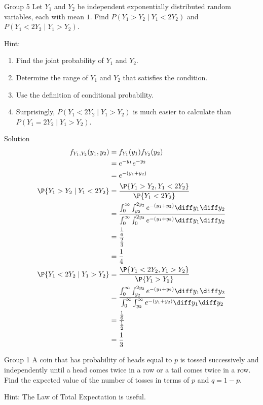 \documentclass{article}
\theoremstyle{plain}
\theoremstyle{definition}
\theoremstyle{remark}
\begin{document}
\begin{problem}
    {Group 5}
    Let $Y_1$ and $Y_2$ be independent exponentially distributed random variables, each with mean $1$. Find $P( Y_1 > Y_2 \mid Y_1 < 2Y_2)$ and $P( Y_1 < 2Y_2 \mid Y_1 > Y_2)$.
    \begin{solution}
        {Hint:}
        \begin{enumerate}
            \item Find the joint probability of $Y_1$ and $Y_2$.
            \item Determine the range of $Y_1$ and $Y_2$ that satisfies the condition.
            \item Use the definition of conditional probability.
            \item Surprisingly, $P( Y_1 < 2Y_2 \mid Y_1 > Y_2)$ is much easier to calculate than $P( Y_1 = 2Y_2 \mid Y_1 > Y_2)$.
        \end{enumerate}
    \end{solution}
\end{problem}

\begin{solution}
    {Solution}
    \begin{align*}
        f_{Y_1,Y_2}(y_1,y_2)
        &= f_{Y_1}(y_1)f_{Y_2}(y_2) \\
        &= e^{-y_1}e^{-y_2} \\
        &= e^{-(y_1+y_2)} \\
        \P{Y_1>Y_2\mid Y_1<2Y_2}
        &= \frac{\P{Y_1>Y_2,Y_1<2Y_2}}{\P{Y_1<2Y_2}} \\
        &= \frac{\int_{0}^{\infty}\int_{y_2}^{2y_2}e^{-(y_1+y_2)}\diff y_1\diff y_2}{\int_{0}^{\infty}\int_{0}^{2y_2}e^{-(y_1+y_2)}\diff y_1\diff y_2} \\
        &= \frac{\frac{1}{6}}{\frac{2}{3}} \\
        &= \frac{1}{4} \\
        \P{Y_1<2Y_2\mid Y_1>Y_2}
        &= \frac{\P{Y_1<2Y_2,Y_1>Y_2}}{\P{Y_1>Y_2}} \\
        &= \frac{\int_{0}^{\infty}\int_{y_2}^{2y_2}e^{-(y_1+y_2)}\diff y_1\diff y_2}{\int_{0}^{\infty}\int_{y_2}^{\infty}e^{-(y_1+y_2)}\diff y_1\diff y_2} \\
        &= \frac{\frac{1}{6}}{\frac{1}{2}} \\
        &= \frac{1}{3}
    \end{align*}
\end{solution}
\begin{problem}
    {Group 1}
    A coin that has probability of heads equal to $p$ is tossed successively and independently until a head comes twice in a row or a tail comes twice in a row. Find the expected value of the number of tosses in terms of $p$ and $q=1-p$.
    \begin{solution}
        {Hint:}
        The Law of Total Expectation is useful.
    \end{solution}
\end{problem}
\end{document}
